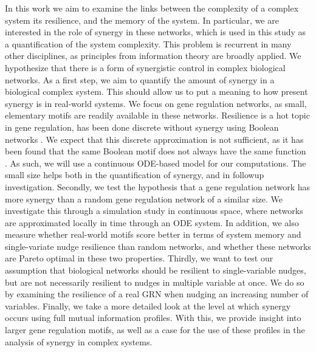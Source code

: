 \documentclass[../main.tex]{subfiles}
\begin{document}
In this work we aim to examine the links between the complexity of a complex system its resilience, and the memory of the system.
In particular, we are interested in the role of synergy in these networks, which is used in this study as a quantification of the system complexity.
This problem is recurrent in many other disciplines, as principles from information theory are broadly applied.
We hypothesize that there is a form of synergistic control in complex biological networks.
As a first step, we aim to quantify the amount of synergy in a biological complex system.
This should allow us to put a meaning to how present synergy is in real-world systems.
We focus on gene regulation networks, as small, elementary motifs are readily available in these networks.
Resilience is a hot topic in gene regulation, has been done discrete without synergy using Boolean networks \cite{peixoto2012emergence}.
We expect that this discrete approximation is not sufficient, as it has been found that the same Boolean motif does not always have the same function \cite{ingram2006network}.
As such, we will use a continuous ODE-based model for our computations.
The small size helps both in the quantification of synergy, and in followup investigation.
Secondly, we test the hypothesis that a gene regulation network has more synergy than a random gene regulation network of a similar size. 
We investigate this through a simulation study in continuous space, where networks are approximated locally in time through an ODE system.
In addition, we also measure whether real-world motifs score better in terms of system memory and single-variate nudge resilience than random networks, and whether these networks are Pareto optimal in these two properties.
Thirdly, we want to test our assumption that biological networks should be resilient to single-variable nudges, but are not necessarily resilient to nudges in multiple variable at once.
We do so by examining the resilience of a real GRN when nudging an increasing number of variables.
Finally, we take a more detailed look at the level at which synergy occurs using full mutual information profiles.
With this, we provide insight into larger gene regulation motifs, as well as a case for the use of these profiles in the analysis of synergy in complex systems.
\end{document}
